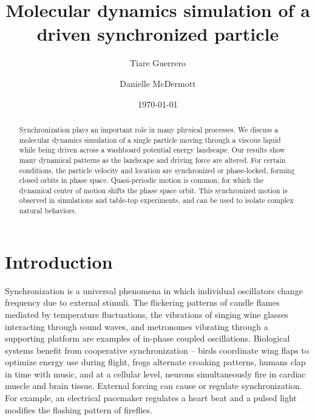 \documentclass[preprint,showpacs,preprintnumbers,amsmath,amssymb,aps,prb]{revtex4-1}
\theoremstyle{remark}
\begin{document}
\title{Molecular dynamics simulation of a driven synchronized particle}

\author{Tiare Guerrero}

\author{Danielle McDermott}

\date{\today}

\begin{abstract}
  Synchronization
  plays an important role in many physical processes.
  We discuss a 
  molecular dynamics simulation
  of a single particle
  moving through
  a viscous liquid
  while being driven 
  across a washboard potential energy landscape.
  Our results show many dynamical patterns
  as the landscape and driving force are altered.
  For certain conditions,
  the particle velocity and location
  are synchronized or 
  phase-locked,
  forming closed orbits in phase space.
  Quasi-periodic motion is common, 
  for which the
  dynamical center of motion shifts the
  phase space orbit.
  This synchronized motion
  is
  observed in 
  simulations and table-top experiments,
  and
  can be used to isolate
  complex natural behaviors.
\end{abstract}

\maketitle 

\section{Introduction} 
Synchronization is a universal phenomena
in which
individual oscillators change frequency due
to external stimuli.\cite{Pikovsky2003}
The
flickering patterns of
candle flames %
mediated by temperature fluctuations,\cite{Okamoto2016}
the vibrations of singing wine glasses interacting 
through sound waves,\cite{Arane2009}
and metronomes vibrating through a supporting platform\cite{Jia2015}
are examples of in-phase coupled oscillations. 
Biological systems benefit from cooperative
synchronization --
birds coordinate wing flaps
to optimize energy use during flight,\cite{Portugal2014}
frogs alternate croaking patterns,\cite{Aihara2014}
humans clap in time with music,\cite{Tranchant2016}
and 
at a cellular level, 
neurons simultaneously fire in cardiac muscle\cite{MartinHall1999}
and brain tissue.\cite{Singer1999}
External forcing can cause or regulate 
synchronization. For example, 
an electrical pacemaker 
regulates a heart beat 
and 
a pulsed light modifies the
flashing pattern of fireflies. 
\end{document}
